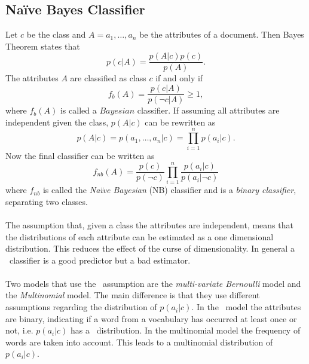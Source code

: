 \subsection{Naïve Bayes Classifier}
Let $c$ be the class and $A = a_1, \dots ,a_n$ be the attributes of a document. Then Bayes Theorem states that 
\begin{equation}
p(c|A)=\frac{p(A|c)p(c)}{p(A)}.
\end{equation}
The attributes $A$ are classified as class $c$ if and only if
\begin{equation}
f_b(A)=\frac{p(c|A)}{p(\neg c|A)} \geq 1,
\end{equation}
where $f_b(A)$ is called a $Bayesian$ classifier. If assuming all attributes are independent given the class, $p(A|c)$ can be rewritten as
\[
p(A|c)=p(a_1,\dots ,a_n | c) = \prod_{i=1}^n p(a_i|c).
\]
Now the final classifier can be written as
\begin{equation}
f_{nb}(A) = \frac{p(c)}{p(\neg c)}\prod_{i=1}^n\frac{p(a_i|c)}{p(a_i|\neg c)}
\end{equation}
where $f_{nb}$ is called the \emph{Naïve Bayesian} (NB) classifier and is a \emph{binary classifier}, separating two classes.
\\\\
The assumption that, given a class the attributes are independent, means that the distributions of each attribute can be estimated as a one dimensional distribution. This reduces the effect of the curse of dimensionality. In general a \nb\ classifier is a good predictor but a bad estimator. \cite{Zhang04optimality}
\\\\
Two models that use the \nb\ assumption are the \emph{multi-variate Bernoulli} model and the \emph{Multinomial} model. The main difference is that they use different assumptions regarding the distribution of $p(a_i|c)$. In the \bn\ model the attributes are binary, indicating if a word from a vocabulary has occurred at least once or not, i.e. $p(a_i|c)$ has a \bn\ distribution. In the multinomial model the frequency of words are taken into account. This leads to a multinomial distribution of $p(a_i|c)$. \cite{McCallum98acomparison}\cite{bernoulliDistr}\cite{multinomialDistr}